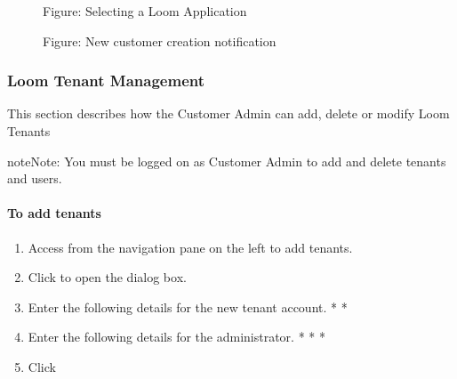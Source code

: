 \documentclass[letterpaper,10pt,english]{sphinxmanual}
\begin{document}
\begin{figure}[htbp]
\centering
\capstart

\noindent{}
\caption{Figure: Selecting a Loom Application}\label{\detokenize{loom_getting_started_guide:id37}}\end{figure}

\begin{figure}[htbp]
\centering
\capstart

\noindent{}
\caption{Figure: New customer creation notification}\label{\detokenize{loom_getting_started_guide:id38}}\end{figure}


\subsubsection{Loom Tenant Management}
\label{\detokenize{loom_getting_started_guide:loom-tenant-management}}
This section describes how the Customer Admin can add, delete or modify Loom Tenants

\begin{sphinxadmonition}{note}{Note:}
You must be logged on as Customer Admin to add and delete tenants and users.
\end{sphinxadmonition}


\paragraph{To add tenants}
\label{\detokenize{loom_getting_started_guide:to-add-tenants}}\begin{enumerate}
\item {} 
Access  from the navigation pane on the left to add tenants.

\item {} 
Click  to open the  dialog box.

\item {} 
Enter the following details for the new tenant account.
* 
* 

\item {} 
Enter the following details for the administrator.
* 
* 
* 

\item {} 
Click 

\end{enumerate}
\end{document}
